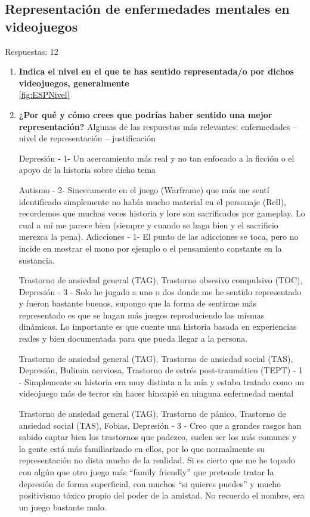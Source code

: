\documentclass[12pt, a4paper,twoside,titlepage]{book}
\begin{document}
\subsection{Representación de enfermedades mentales en videojuegos}
Respuestas: 12
\begin{enumerate}[label=\textbf{\arabic*}.]
     \item \textbf{Indica el nivel en el que te has sentido representada/o por dichos videojuegos, generalmente}\\
     \ref{fig:ESPNivel}
     \item \textbf{¿Por qué y cómo crees que podrías haber sentido una mejor representación?}
    \label{representacionCastellano}
    Algunas de las respuestas más relevantes: enfermedades – nivel de representación – justificación 
    
    Depresión - 1- Un acercamiento más real y no tan enfocado a la ficción o el apoyo de la historia sobre dicho tema
    
    Autismo - 2- Sinceramente en el juego (Warframe) que más me sentí identificado simplemente no había mucho material en el personaje (Rell), recordemos que muchas veces historia y lore son sacrificados por gameplay. Lo cual a mí me parece bien (siempre y cuando se haga bien y el sacrificio merezca la pena).
    Adicciones - 1- El punto de las adicciones se toca, pero no incide en mostrar el mono por ejemplo o el pensamiento constante en la sustancia.
    
    Trastorno de ansiedad general (TAG), Trastorno obsesivo compulsivo (TOC), Depresión - 3 - Solo he jugado a uno o dos donde me he sentido representado y fueron bastante buenos, supongo que la forma de sentirme más representado es que se hagan más juegos reproduciendo las mismas dinámicas. Lo importante es que cuente una historia basada en experiencias reales y bien documentada para que pueda llegar a la persona.
    
    Trastorno de ansiedad general (TAG), Trastorno de ansiedad social (TAS), Depresión, Bulimia nerviosa, Trastorno de estrés post-traumático (TEPT) - 1 - Simplemente su historia era muy distinta a la mía y estaba tratado como un videojuego más de terror sin hacer hincapié en ninguna enfermedad mental 
    
    Trastorno de ansiedad general (TAG), Trastorno de pánico, Trastorno de ansiedad social (TAS), Fobias, Depresión - 3 - Creo que a grandes rasgos han sabido captar bien los trastornos que padezco, suelen ser los más comunes y la gente está más familiarizado en ellos, por lo que normalmente su representación no dista mucho de la realidad. Si es cierto que me he topado con algún que otro juego más ``family friendly'' que pretende tratar la depresión de forma superficial, con muchos ``si quieres puedes'' y mucho positivismo tóxico propio del poder de la amistad. No recuerdo el nombre, era un juego bastante malo.
    

\end{enumerate}
\end{document}

